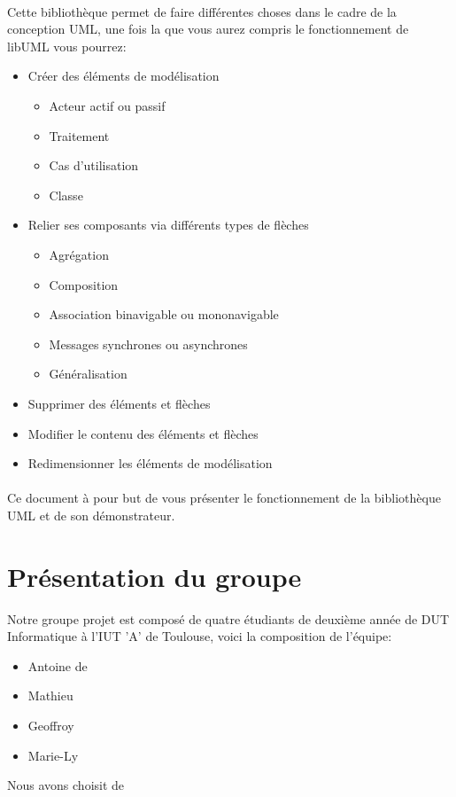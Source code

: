 	\paragraph{}	
	Cette bibliothèque permet de faire différentes choses dans le cadre de la conception UML, une fois la
	que vous aurez compris le fonctionnement de libUML vous pourrez:
	\begin{itemize}
		\item Créer des éléments de modélisation 
			\begin{itemize}
				\item Acteur actif ou passif
				\item Traitement
				\item Cas d'utilisation
				\item Classe
			\end{itemize}
		\item Relier ses composants via différents types de flèches
			\begin{itemize}
				\item Agrégation
				\item Composition
				\item Association binavigable ou mononavigable
				\item Messages synchrones ou asynchrones
				\item Généralisation
			\end{itemize}
		\item Supprimer des éléments et flèches
		\item Modifier le contenu des éléments et flèches
		\item Redimensionner les éléments de modélisation
	\end{itemize}
	\paragraph{}
Ce document à pour but de vous présenter le fonctionnement de la bibliothèque UML et de son démonstrateur. 

\section*{Présentation du groupe}
	Notre groupe projet est composé de quatre étudiants de deuxième année de DUT Informatique à l'IUT 'A' de Toulouse, voici la composition de l'équipe: 
	\begin{itemize}
		\item Antoine de  
		\item Mathieu  
		\item Geoffroy 
		\item Marie-Ly  
	\end{itemize}
Nous avons choisit de 
